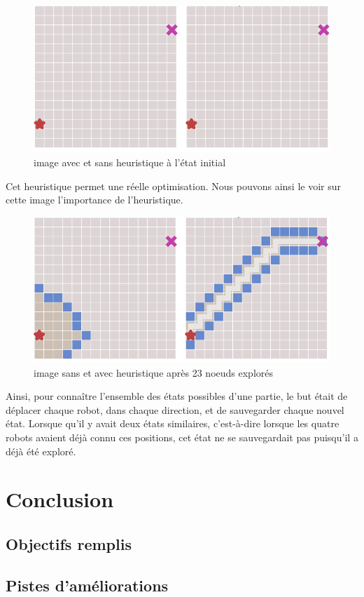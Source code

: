 \documentclass[a4paper, 12pt]{article}
\begin{document}
           \begin{figure}[H]
                \centering
                \includegraphics[scale=0.75]{images/1.png}
                \caption{image\cite{redblob} avec et sans heuristique à l'état initial}
            \end{figure}
        
        Cet heuristique permet une réelle optimisation. Nous pouvons ainsi le voir sur cette image l'importance de l'heuristique.
        
           \begin{figure}[H]
                \centering
                \includegraphics[scale=0.75]{images/2.png}
                \caption{image\cite{redblob} sans et avec heuristique après 23 noeuds explorés }
            \end{figure}
        
    Ainsi, pour connaître l'ensemble des états possibles d'une partie, le but était de déplacer chaque robot, dans chaque direction, et de sauvegarder chaque nouvel état. Lorsque qu'il y avait deux états similaires, c'est-à-dire lorsque les quatre robots avaient déjà connu ces positions, cet état ne se sauvegardait pas  puisqu'il a déjà été exploré.
\newpage %

\section{Conclusion}
    \subsection{Objectifs remplis}
    \subsection{Pistes d'améliorations}

\newpage %



\end{document}
